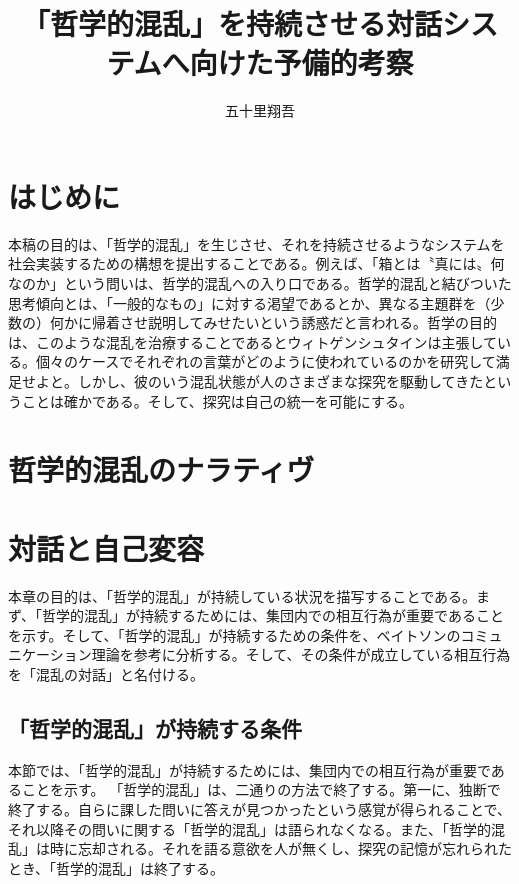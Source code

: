 \documentclass[b5j,twoside,twocolumn]{utarticle}
\title{「哲学的混乱」を持続させる対話システムへ向けた予備的考察}
\author{五十里翔吾}
\date{\vspace{-5mm}}
\makeatletter
\def\yakuchu{%
\@ifnextchar[\@xfootnote %
{\stepcounter{yakuchu}%
\protected@xdef\@thefnmark{\theyakuchu}%
\@footnotemark\@footnotetext}}
\makeatother
\begin{document}
\maketitle

\setlength{\footskip}{-2mm}
\chead[]{}
\lfoot[]{\thepage{}}
\cfoot[]{}
\rfoot[\thepage{}]{}

\let\yakuchu=\endnote
\renewcommand{\footnoterule}{\noindent\rule{100mm}{0.3mm}\vskip2mm}
\thispagestyle{fancy}
\section{はじめに}
本稿の目的は、「哲学的混乱」を生じさせ、それを持続させるようなシステムを社会実装するための構想を提出することである。例えば、「箱とは〝真には〟何なのか」という問いは、哲学的混乱への入り口である。哲学的混乱と結びついた思考傾向とは、「一般的なもの」に対する渇望であるとか、異なる主題群を（少数の）何かに帰着させ説明してみせたいという誘惑だと言われる。哲学の目的は、このような混乱を治療することであるとウィトゲンシュタインは主張している。個々のケースでそれぞれの言葉がどのように使われているのかを研究して満足せよと。しかし、彼のいう混乱状態が人のさまざまな探究を駆動してきたということは確かである。そして、探究は自己の統一を可能にする。


\section{哲学的混乱のナラティヴ}
\section{}

\section{対話と自己変容}
本章の目的は、「哲学的混乱」が持続している状況を描写することである。まず、「哲学的混乱」が持続するためには、集団内での相互行為が重要であることを示す。そして、「哲学的混乱」が持続するための条件を、ベイトソンのコミュニケーション理論を参考に分析する。そして、その条件が成立している相互行為を「混乱の対話」と名付ける。

\subsection{「哲学的混乱」が持続する条件}
本節では、「哲学的混乱」が持続するためには、集団内での相互行為が重要であることを示す。
「哲学的混乱」は、二通りの方法で終了する。第一に、独断で終了する。自らに課した問いに答えが見つかったという感覚が得られることで、それ以降その問いに関する「哲学的混乱」は語られなくなる。また、「哲学的混乱」は時に忘却される。それを語る意欲を人が無くし、探究の記憶が忘れられたとき、「哲学的混乱」は終了する。
\end{document}
